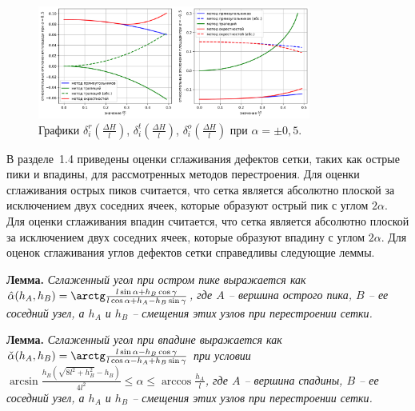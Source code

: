 \documentclass[a4paper,14pt]{extarticle}                     %
\theoremstyle{plain}                                         %
\begin{document}
\begin{figure}[ht]
\centering
\includegraphics[width=0.8\textwidth]{fig/2dr_remesh_fix_alfa_chart.png}
\singlespacing
\caption{Графики $\delta_i^r(\frac{\Delta H}{l})$, $\delta_i^t(\frac{\Delta H}{l})$, $\delta_i^o(\frac{\Delta H}{l})$ при $\alpha = \pm 0,5$.}
\label{fig:text_1_remesh_fix_alfa_chart}
\end{figure}


В разделе~1.4 приведены оценки сглаживания дефектов сетки, таких как острые пики и впадины, для рассмотренных методов перестроения.
Для оценки сглаживания острых пиков считается, что сетка является абсолютно плоской за исключением двух соседних ячеек, которые образуют острый пик с углом $2 \alpha$.
Для оценки сглаживания впадин считается, что сетка является абсолютно плоской за исключением двух соседних ячеек, которые образуют впадину с углом $2 \alpha$.
Для оценок сглаживания углов дефектов сетки справедливы следующие леммы.

\textbf{Лемма.} \textit{Сглаженный угол при остром пике выражается как $\hat{\alpha}(h_A, h_B) = \arctg \frac{l \sin \alpha + h_B \cos \gamma}{l \cos \alpha + h_A - h_B \sin \gamma}$, где $A$ -- вершина острого пика, $B$ -- ее соседний узел, а $h_A$ и $h_B$ -- смещения этих узлов при перестроении сетки.}

\textbf{Лемма.} \textit{Сглаженный угол при впадине выражается как $\check{\alpha}(h_A, h_B) = \arctg \frac{l \sin \alpha - h_B \cos \gamma}{l \cos \alpha - h_A + h_B \sin \gamma}$ при условии $\arcsin \frac{h_B ( \sqrt{8 l^2 + h_B^2} - h_B )}{4 l^2} \le \alpha \le \arccos \frac{h_A}{l}$, где $A$ -- вершина спадины, $B$ -- ее соседний узел, а $h_A$ и $h_B$ -- смещения этих узлов при перестроении сетки.}
\end{document}
